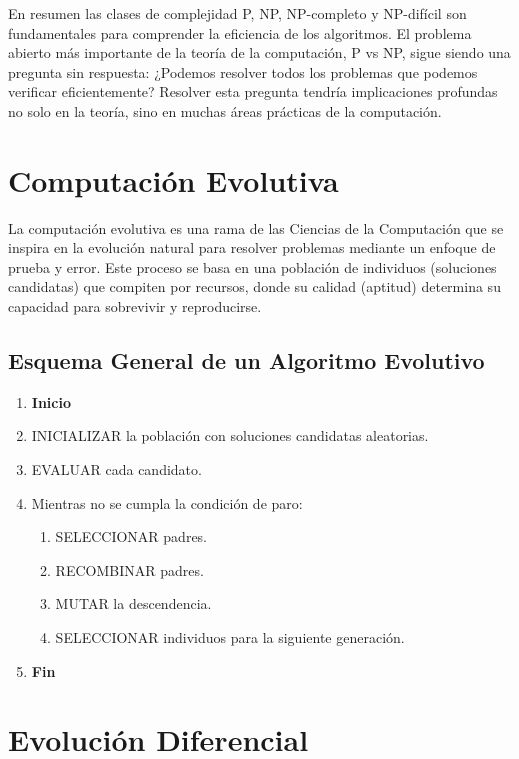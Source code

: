 \documentclass[12pt,titlepage,twoside,openright]{book}
\begin{document}
En resumen las clases de complejidad P, NP, NP-completo y NP-dif\'icil son fundamentales para comprender la eficiencia de los algoritmos. El problema abierto m\'as importante de la teor\'ia de la computaci\'on, P vs NP, sigue siendo una pregunta sin respuesta: ¿Podemos resolver todos los problemas que podemos verificar eficientemente? Resolver esta pregunta tendr\'ia implicaciones profundas no solo en la teor\'ia, sino en muchas \'areas pr\'acticas de la computaci\'on.

\section{Computación Evolutiva}

La computación evolutiva es una rama de las Ciencias de la Computación que se inspira en la evolución natural para resolver problemas mediante un enfoque de prueba y error. Este proceso se basa en una población de individuos (soluciones candidatas) que compiten por recursos, donde su calidad (aptitud) determina su capacidad para sobrevivir y reproducirse.

\subsection{Esquema General de un Algoritmo Evolutivo}
\begin{enumerate}
	\item \textbf{Inicio}
	\item INICIALIZAR la población con soluciones candidatas aleatorias.
	\item EVALUAR cada candidato.
	\item Mientras no se cumpla la condición de paro:
	      \begin{enumerate}
		      \item SELECCIONAR padres.
		      \item RECOMBINAR padres.
		      \item MUTAR la descendencia.
		      \item SELECCIONAR individuos para la siguiente generación.
	      \end{enumerate}
	\item \textbf{Fin}
\end{enumerate}

\section{Evolución Diferencial}
\end{document}
